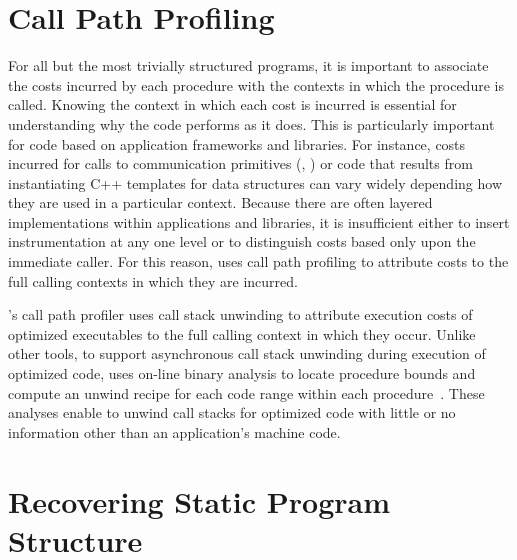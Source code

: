\documentclass[11pt,letterpaper]{report}
\begin{document}
\section{Call Path Profiling}

For all but the most trivially structured programs, it is important to associate the costs incurred by each procedure with the contexts in which the procedure is called.
Knowing the context in which each cost is incurred is essential for understanding why the code performs as it does.
This is particularly important for code based on application frameworks and libraries.
For instance, costs incurred for calls to communication primitives (\eg{}, ) or code that results from instantiating C++ templates for data structures can vary widely depending how they are used in a particular context.
Because there are often layered implementations within applications and libraries, it is insufficient either to insert instrumentation at any one level or to distinguish costs based only upon the immediate caller.
For this reason, \HPCToolkit{} uses call path profiling to attribute costs to the full calling contexts in which they are incurred.

\HPCToolkit{}'s \hpcrun{} call path profiler uses call stack unwinding to attribute execution costs of optimized executables to the full calling context in which they occur.
Unlike other tools, to support asynchronous call stack unwinding during execution of optimized code, \hpcrun{} uses on-line binary analysis to locate procedure bounds and compute an unwind recipe for each code range within each procedure~\cite{Tallent-MC-Fagan:2009:PLDI-hpctoolkit-binary-analysis}.
These analyses enable \hpcrun{} to unwind call stacks for optimized code with little or no information other than an application's machine code.

\begin{comment}
To attribute performance back to source code, \HPCToolkit{} combines a call path profile with information gleaned through post-mortem analysis of an application's object code and its debugging sections.
This post-mortem analysis of an executable recovers its program structure and reconstructs a mapping from instructions back to source lines, loops, inlined functions, and procedures.
\HPCToolkit{}'s ability to attribute costs to dynamic call paths, including loops and inlined functions, for optimized code without a special-purpose compiler is unique.
\end{comment}


\section{Recovering Static Program Structure}
\end{document}
